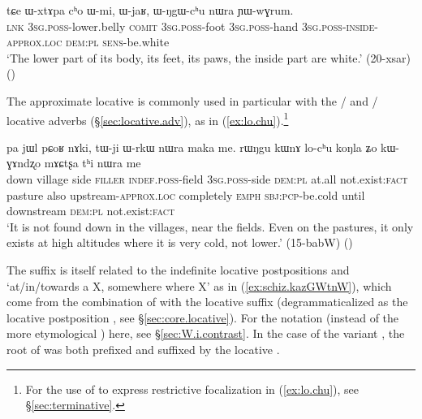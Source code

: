    \begin{exe}
\ex \label{ex:WNgW.chu}
 \gll tɕe ɯ-xtɤpa cʰo ɯ-mi, ɯ-jaʁ, ɯ-ŋgɯ-cʰu nɯra ɲɯ-wɣrum. \\
\textsc{lnk} \textsc{3sg}.\textsc{poss}-lower.belly \textsc{comit}  \textsc{3sg}.\textsc{poss}-foot  \textsc{3sg}.\textsc{poss}-hand  \textsc{3sg}.\textsc{poss}-\textsc{inside}-\textsc{approx}.\textsc{loc} \textsc{dem}:\textsc{pl}  \textsc{sens}-be.white \\
\glt `The lower part of its body, its feet, its paws, the inside part are white.' (20-xsar)
()
    \end{exe}

The approximate locative  is commonly used in particular with the  /  and  /  locative adverbs (§\ref{sec:locative.adv}), as in (\ref{ex:lo.chu}).\footnote{For the use of  to express restrictive focalization in (\ref{ex:lo.chu}), see §\ref{sec:terminative}. }

\begin{exe}
\ex \label{ex:lo.chu}
 \gll  pa jɯl pɕoʁ nɤki, tɯ-ji ɯ-rkɯ nɯra maka me. rɯŋgu kɯnɤ lo-cʰu koŋla ʑo kɯ-ɣɤndʐo mɤɕtʂa tʰi nɯra me \\
 down village side \textsc{filler} \textsc{indef}.\textsc{poss}-field \textsc{3sg}.\textsc{poss}-side \textsc{dem}:\textsc{pl} at.all not.exist:\textsc{fact} pasture also upstream-\textsc{approx}.\textsc{loc} completely \textsc{emph} \textsc{sbj}:\textsc{pcp}-be.cold until downstream \textsc{dem}:\textsc{pl} not.exist:\textsc{fact} \\
\glt  `It is not found down in the villages, near the fields. Even on the pastures, it only exists at high altitudes where it is very cold, not lower.' (15-babW)
()
\end{exe}
 
The suffix  is itself related to the indefinite locative postpositions  and  `at/in/towards a X, somewhere where X' as in (\ref{ex:schiz.kazGWtnW}), which come from the combination of  with the locative suffix  (degrammaticalized as the locative postposition , see §\ref{sec:core.locative}). For the notation  (instead of the more etymological ) here, see §\ref{sec:W.i.contrast}. In the case of the variant , the root of  was both prefixed and suffixed by the locative .

